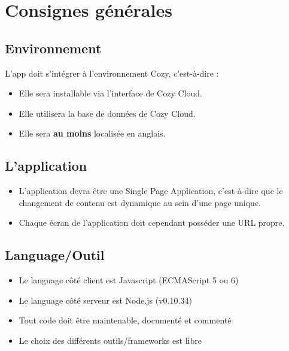 \documentclass{42-fr}
\begin{document}

\chapter{Consignes g\'en\'erales}


    \section{Environnement}
        L'app doit s'int\'egrer \`a l'environnement Cozy, c'est-\`a-dire :

        \begin{itemize}\itemsep1pt
            \item Elle sera installable via l'interface de Cozy Cloud.
            \item Elle utilisera la base de donn\'ees de Cozy Cloud.
            \item Elle sera \textbf{au moins} localis\'ee en anglais.
        \end{itemize}

    \section{L'application}
        \begin{itemize}\itemsep1pt
            \item L'application devra \^etre une Single Page Application, c'est-\`a-dire
				que le changement de contenu est dynamique au sein d'une page unique.
            \item Chaque écran de l'application doit cependant poss\'eder une URL propre.
        \end{itemize}

    \section{Language/Outil}
        \begin{itemize}\itemsep1pt
            \item Le language c\^ot\'e client est Javascript (ECMAScript 5 ou 6)
            \item Le language c\^ot\'e serveur est Node.js (v0.10.34)
            \item Tout code doit \^etre maintenable, document\'e et comment\'e
            \item Le choix des diff\'erents outils/frameworks est libre
        \end{itemize}
\end{document}

